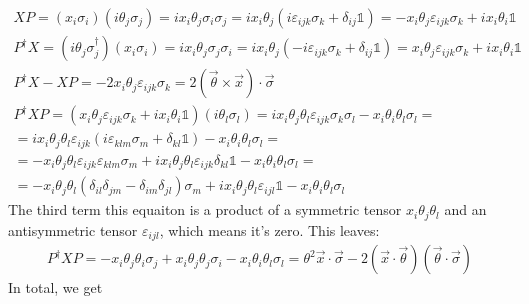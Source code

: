 \documentclass{article}
\begin{document}
\begin{equation}
\begin{gathered}
    XP = (x_i\sigma_i)(i\theta_j\sigma_j) = ix_i\theta_j \sigma_i \sigma_j = ix_i\theta_j (i\varepsilon_{ijk}\sigma_k + \delta_{ij}\mathbb{1}) = -x_i\theta_j\varepsilon_{ijk}\sigma_k + ix_i\theta_i\mathbb{1}
    \\
    P^\dagger X = (i\theta_j\sigma_j^\dagger)(x_i\sigma_i) = ix_i\theta_j \sigma_j \sigma_i = ix_i\theta_j (-i\varepsilon_{ijk}\sigma_k + \delta_{ij}\mathbb{1}) = x_i\theta_j\varepsilon_{ijk}\sigma_k + ix_i\theta_i\mathbb{1}
    \\
    P^\dagger X - XP = -2x_i\theta_j\varepsilon_{ijk}\sigma_k = 2(\vec{\theta}\times\vec{x})\cdot\vec{\sigma}
    \\
    P^\dagger X P = (x_i\theta_j\varepsilon_{ijk}\sigma_k + ix_i\theta_i\mathbb{1})(i\theta_l\sigma_l) = ix_i\theta_j\theta_l\varepsilon_{ijk}\sigma_k\sigma_l - x_i\theta_i\theta_l\sigma_l = \\ = 
    ix_i\theta_j\theta_l\varepsilon_{ijk}(i\varepsilon_{klm}\sigma_m + \delta_{kl}\mathbb{1}) - x_i\theta_i\theta_l\sigma_l = \\ =
    -x_i\theta_j\theta_l\varepsilon_{ijk}\varepsilon_{klm}\sigma_m + ix_i\theta_j\theta_l\varepsilon_{ijk}\delta_{kl}\mathbb{1} - x_i\theta_i\theta_l\sigma_l = \\ =
    -x_i\theta_j\theta_l(\delta_{il}\delta_{jm} - \delta_{im}\delta_{jl})\sigma_m + ix_i\theta_j\theta_l\varepsilon_{ijl}\mathbb{1} - x_i\theta_i\theta_l\sigma_l
\end{gathered}
\end{equation}
The third term this equaiton is a product of a symmetric tensor $x_i\theta_j\theta_l$ and an antisymmetric tensor $\varepsilon_{ijl}$, which means it's zero. This leaves:
\begin{equation}
\begin{gathered}
    P^\dagger X P = -x_i\theta_j\theta_i\sigma_j + x_i\theta_j\theta_j\sigma_i - x_i\theta_i\theta_l\sigma_l = \theta^2\vec{x}\cdot\vec{\sigma} - 2(\vec{x}\cdot\vec{\theta})(\vec{\theta}\cdot\vec{\sigma})
\end{gathered}
\end{equation}
In total, we get
\end{document}
